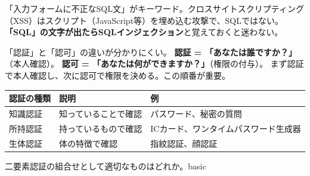 
\begin{trickwarn}
「入力フォームに不正なSQL文」がキーワード。クロスサイトスクリプティング（XSS）はスクリプト（JavaScript等）を埋め込む攻撃で、SQLではない。\textbf{「SQL」の文字が出たらSQLインジェクション}と覚えておくと迷わない。
\end{trickwarn}





\mondaipage
{}

\begin{stumble}
「認証」と「認可」の違いが分かりにくい。
\textbf{認証 = 「あなたは誰ですか？」}（本人確認）。
\textbf{認可 = 「あなたは何ができますか？」}（権限の付与）。
まず認証で本人確認し、次に認可で権限を決める。この順番が重要。
\end{stumble}

\begin{comparison}
\begin{tabularx}{\textwidth}{lXX}
  \toprule
  \textbf{認証の種類} & \textbf{説明} & \textbf{例} \\
  \midrule
  知識認証 & 知っていることで確認 & パスワード、秘密の質問 \\
  所持認証 & 持っているもので確認 & ICカード、ワンタイムパスワード生成器 \\
  生体認証 & 体の特徴で確認 & 指紋認証、顔認証 \\
  \bottomrule
\end{tabularx}
\end{comparison}


\begin{mondai}{二要素認証の組合せとして適切なものはどれか。}{basic}
\end{mondai}

